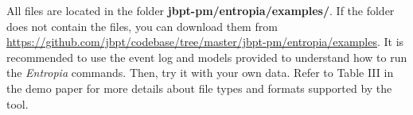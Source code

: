 \vspace{1em}
All files are located in the folder \textbf{jbpt-pm\slash entropia\slash examples\slash}. If the folder does not contain the files, you can download them from \url{https://github.com/jbpt/codebase/tree/master/jbpt-pm/entropia/examples}. It is recommended to use the event log and models provided to understand how to run the \textit{Entropia} commands. Then, try it with your own data. Refer to Table III in the demo paper for more details about file types and formats supported by the tool.
